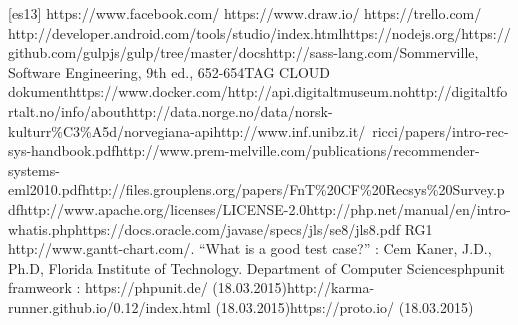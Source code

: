 [es13] https://www.facebook.com/ \newline
[es14] https://www.draw.io/ \newline
[es15] https://trello.com/ \newline
[es22] http://developer.android.com/tools/studio/index.html\newline
[es23] https://nodejs.org/\newline
[es24] https://github.com/gulpjs/gulp/tree/master/docs\newline
[es25] http://sass-lang.com/\newline
[AS6] Sommerville, Software Engineering, 9th ed., 652-654\newline  
[EHW1] TAG CLOUD dokument\newline
[EHW2] https://www.docker.com/\newline
[HM1] http://api.digitaltmuseum.no\newline
[HM2] http://digitaltfortalt.no/info/about\newline
[HM3] http://data.norge.no/data/norsk-kulturr\%C3\%A5d/norvegiana-api\newline
[HM4] http://www.inf.unibz.it/~ricci/papers/intro-rec-sys-handbook.pdf\newline
[HM5] http://www.prem-melville.com/publications/recommender-systems-eml2010.pdf\newline
[HM6] http://files.grouplens.org/papers/FnT\%20CF\%20Recsys\%20Survey.pdf\newline
[HM7] http://www.apache.org/licenses/LICENSE-2.0\newline
[HM8] http://php.net/manual/en/intro-whatis.php\newline
[HM9] https://docs.oracle.com/javase/specs/jls/se8/jls8.pdf\newline
RG1 http://www.gantt-chart.com/. “What is a good test case?” : Cem Kaner, J.D., Ph.D, Florida Institute of Technology. Department of Computer Sciences\newline
[KF2] phpunit framweork : https://phpunit.de/ (18.03.2015)\newline
[KF3] http://karma-runner.github.io/0.12/index.html (18.03.2015)\newline
[KF4] https://proto.io/ (18.03.2015)\newline

\cleardoublepage